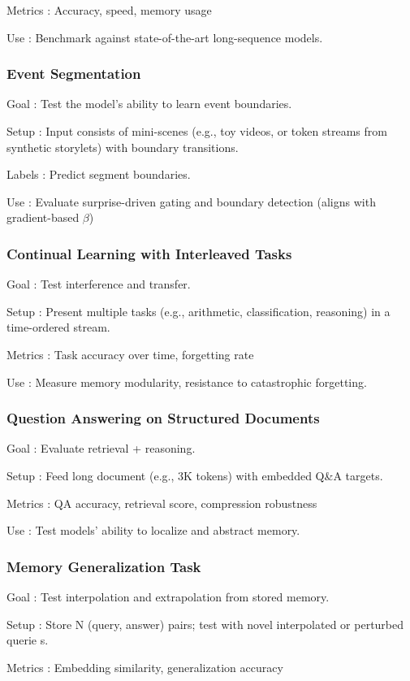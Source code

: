 Metrics : Accuracy, speed, memory usage

Use : Benchmark against state-of-the-art long-sequence models.

\subsubsection{Event Segmentation}
Goal : Test the model’s ability to learn event boundaries.

Setup : Input consists of mini-scenes (e.g., toy videos, or token streams from synthetic storylets) with boundary transitions.

Labels : Predict segment boundaries.

Use : Evaluate surprise-driven gating and boundary detection (aligns with gradient-based $\beta$)

\subsubsection{Continual Learning with Interleaved Tasks}
Goal : Test interference and transfer.

Setup : Present multiple tasks (e.g., arithmetic, classification, reasoning) in a time-ordered stream.

Metrics : Task accuracy over time, forgetting rate

Use : Measure memory modularity, resistance to catastrophic forgetting.

\subsubsection{Question Answering on Structured Documents}
Goal : Evaluate retrieval + reasoning.

Setup : Feed long document (e.g., 3K tokens) with embedded Q\&A targets.

Metrics : QA accuracy, retrieval score, compression robustness

Use : Test models’ ability to localize and abstract memory.

\subsubsection{Memory Generalization Task}
Goal : Test interpolation and extrapolation from stored memory.

Setup : Store N (query, answer) pairs; test with novel interpolated or perturbed querie        s.

Metrics : Embedding similarity, generalization accuracy

